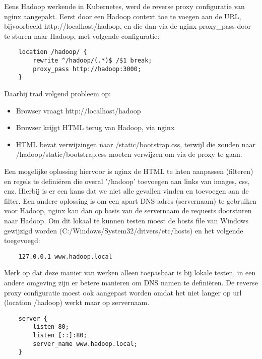 \newline
\newline
Eens Hadoop werkende in Kubernetes, werd de reverse proxy configuratie van nginx aangepakt. Eerst door een Hadoop context toe te voegen aan de URL, bijvoorbeeld http://localhost/hadoop, en die dan via de nginx proxy\_pass door te sturen naar Hadoop, met volgende configuratie:
\newline
\newline
\begin{lstlisting}
    location /hadoop/ {
        rewrite ^/hadoop/(.*)$ /$1 break;
        proxy_pass http://hadoop:3000;
    }
\end{lstlisting}

Daarbij trad volgend probleem op:
\newline
\newline
\begin{itemize}
    \item Browser vraagt http://localhost/hadoop
    \item Browser krijgt HTML terug van Hadoop, via nginx
    \item HTML bevat verwijzingen naar /static/bootstrap.css, terwijl die zouden naar /hadoop/static/bootstrap.css moeten verwijzen om via de proxy te gaan.
\end{itemize}


Een mogelijke oplossing hiervoor is nginx de HTML te laten aanpassen (filteren) en regels te definiëren die overal '/hadoop' toevoegen aan links van images, css, enz. Hierbij is er een kans dat we niet alle gevallen vinden en toevoegen aan de filter.
Een andere oplossing is om een apart DNS adres (servernaam) te gebruiken voor Hadoop, nginx kan dan op basis van de servernaam de requests doorsturen naar Hadoop. Om dit lokaal te kunnen testen moest de hosts file van Windows gewijzigd worden 
\newline
(C:/Windows/System32/drivers/etc/hosts) en het volgende toegevoegd:
\begin{lstlisting}
    127.0.0.1 www.hadoop.local
\end{lstlisting}

Merk op dat deze manier van werken alleen toepasbaar is bij lokale testen, in een andere omgeving zijn er betere manieren om DNS namen te definiëren.
\newline
De reverse proxy configuratie moest ook aangepast worden omdat het niet langer op url (location /hadoop) werkt maar op servernaam.
\newline
\newline
\begin{lstlisting}
    server {
        listen 80;
        listen [::]:80;
        server_name www.hadoop.local;
    }
\end{lstlisting}

